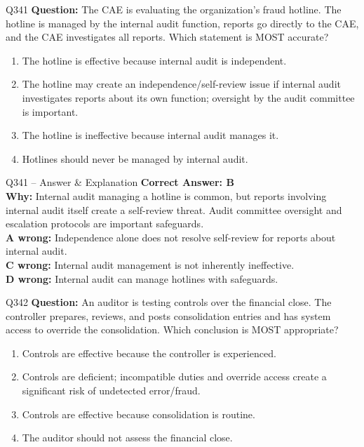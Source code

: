 \documentclass[aspectratio=169,10pt]{beamer}
\begin{document}
	\begin{frame}[t]{Q341}
		\small
		\textbf{Question:} The CAE is evaluating the organization's fraud hotline. The hotline is managed by the internal audit function, reports go directly to the CAE, and the CAE investigates all reports. Which statement is MOST accurate?
		\begin{enumerate}[label=\Alph*.,itemsep=1pt,topsep=2pt]
			\item The hotline is effective because internal audit is independent.
			\item The hotline may create an independence/self-review issue if internal audit investigates reports about its own function; oversight by the audit committee is important.
			\item The hotline is ineffective because internal audit manages it.
			\item Hotlines should never be managed by internal audit.
		\end{enumerate}
	\end{frame}
	
	\begin{frame}[t]{Q341 -- Answer \& Explanation}
		\small
		\textbf{Correct Answer: B} \\[4pt]
		\textbf{Why:} Internal audit managing a hotline is common, but reports involving internal audit itself create a self-review threat. Audit committee oversight and escalation protocols are important safeguards. \\[4pt]
		\textbf{A wrong:} Independence alone does not resolve self-review for reports about internal audit. \\[2pt]
		\textbf{C wrong:} Internal audit management is not inherently ineffective. \\[2pt]
		\textbf{D wrong:} Internal audit can manage hotlines with safeguards.
	\end{frame}
	
	\begin{frame}[t]{Q342}
		\small
		\textbf{Question:} An auditor is testing controls over the financial close. The controller prepares, reviews, and posts consolidation entries and has system access to override the consolidation. Which conclusion is MOST appropriate?
		\begin{enumerate}[label=\Alph*.,itemsep=1pt,topsep=2pt]
			\item Controls are effective because the controller is experienced.
			\item Controls are deficient; incompatible duties and override access create a significant risk of undetected error/fraud.
			\item Controls are effective because consolidation is routine.
			\item The auditor should not assess the financial close.
		\end{enumerate}
	\end{frame}
	
\end{document}
